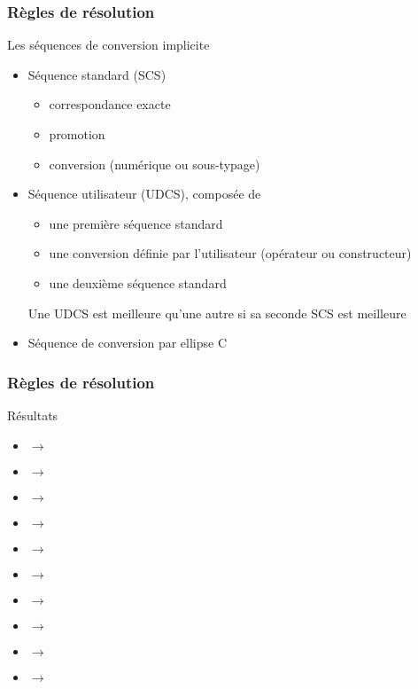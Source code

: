 \documentclass[svgnames]{beamer}
\begin{document}
\begin{frame}
\frametitle{Règles de résolution}
\begin{block}{Les séquences de conversion implicite}
\begin{itemize}\footnotesize
\item Séquence standard (SCS)
\begin{itemize}
\footnotesize
\item correspondance exacte
\item promotion
\item conversion (numérique ou sous-typage)
\end{itemize}
\item Séquence utilisateur (UDCS), composée de
\begin{itemize}
\footnotesize
\item une première séquence standard
\item une conversion définie par l'utilisateur (opérateur ou constructeur)
\item une deuxième séquence standard
\end{itemize}
Une UDCS est meilleure qu'une autre si sa seconde SCS est meilleure
\item Séquence de conversion par ellipse C
\end{itemize}
\end{block}
\end{frame}

\begin{frame}[t]
\frametitle{Règles de résolution}

\begin{block}{Résultats}
{
\begin{itemize}
\footnotesize
\item {} $\rightarrow$ 
\item {} $\rightarrow$ 
\item {} $\rightarrow$ 
\item {} $\rightarrow$  
\item {} $\rightarrow$ 
\end{itemize}
}
{
\begin{itemize}
\footnotesize
\item {} $\rightarrow$ 
\item {} $\rightarrow$ 
\item {} $\rightarrow$ 
\item {} $\rightarrow$  
\item {} $\rightarrow$ 
\end{itemize}
}
\end{block}
\end{frame}
\end{document}
